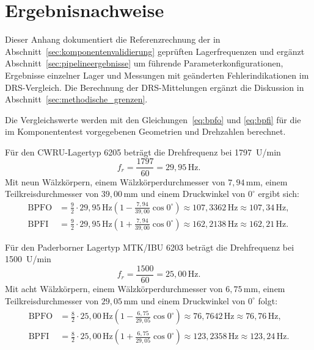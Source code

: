 \chapter{Ergebnisnachweise}
\label{app:pipelineergebnisse}
\begingroup
\raggedbottom
\makeatletter{}\makeatother

Dieser Anhang dokumentiert die Referenzrechnung der in
Abschnitt~\ref{sec:komponentenvalidierung} geprüften Lagerfrequenzen und ergänzt
Abschnitt~\ref{sec:pipelineergebnisse} um führende Parameterkonfigurationen,
Ergebnisse einzelner Lager und Messungen mit geänderten Fehlerindikationen im
DRS-Vergleich. Die Berechnung der DRS-Mittelungen ergänzt die Diskussion
in Abschnitt~\ref{sec:methodische_grenzen}.

\label{app:lagerfrequenz_referenzrechnung}

Die Vergleichswerte werden mit den Gleichungen~\eqref{eq:bpfo} und
\eqref{eq:bpfi} für die im Komponententest vorgegebenen Geometrien und
Drehzahlen berechnet.

Für den CWRU-Lagertyp 6205 beträgt die Drehfrequenz bei 1797~U/min
\[
  f_r=\frac{1797}{60}=29{,}95\,\mathrm{Hz}.
\]
Mit neun Wälzkörpern, einem
Wälzkörperdurchmesser von $7{,}94\,\mathrm{mm}$, einem Teilkreisdurchmesser
von $39{,}00\,\mathrm{mm}$ und einem Druckwinkel von $0^\circ$ ergibt sich:
\begin{equation}
  \begin{aligned}
    \mathrm{BPFO}
      &= \frac{9}{2}\cdot29{,}95\,\mathrm{Hz}
         \left(1-\frac{7{,}94}{39{,}00}\cos 0^\circ\right)
       \approx 107{,}3362\,\mathrm{Hz}
       \approx 107{,}34\,\mathrm{Hz}, \\
    \mathrm{BPFI}
      &= \frac{9}{2}\cdot29{,}95\,\mathrm{Hz}
         \left(1+\frac{7{,}94}{39{,}00}\cos 0^\circ\right)
       \approx 162{,}2138\,\mathrm{Hz}
       \approx 162{,}21\,\mathrm{Hz}.
  \end{aligned}
\end{equation}

Für den Paderborner Lagertyp MTK/IBU 6203 beträgt die Drehfrequenz bei
1500~U/min
\[
  f_r=\frac{1500}{60}=25{,}00\,\mathrm{Hz}.
\]
Mit acht Wälzkörpern, einem
Wälzkörperdurchmesser von $6{,}75\,\mathrm{mm}$, einem Teilkreisdurchmesser
von $29{,}05\,\mathrm{mm}$ und einem Druckwinkel von $0^\circ$ folgt:
\begin{equation}
  \begin{aligned}
    \mathrm{BPFO}
      &= \frac{8}{2}\cdot25{,}00\,\mathrm{Hz}
         \left(1-\frac{6{,}75}{29{,}05}\cos 0^\circ\right)
       \approx 76{,}7642\,\mathrm{Hz}
       \approx 76{,}76\,\mathrm{Hz}, \\
    \mathrm{BPFI}
      &= \frac{8}{2}\cdot25{,}00\,\mathrm{Hz}
         \left(1+\frac{6{,}75}{29{,}05}\cos 0^\circ\right)
       \approx 123{,}2358\,\mathrm{Hz}
       \approx 123{,}24\,\mathrm{Hz}.
  \end{aligned}
\end{equation}

